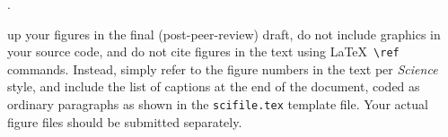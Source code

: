 \documentclass[12pt]{article}
\newcounter{lastnote}
\newenvironment{scilastnote}{%
\setcounter{lastnote}{\value{enumiv}}%
\addtocounter{lastnote}{+1}%
\begin{list}%
{\arabic{lastnote}.}
{\setlength{\leftmargin}{.22in}}
{\setlength{\labelsep}{.5em}}}
{\end{list}}
\begin{document}
\begin{scilastnote}
\end{scilastnote}






\clearpage

up your figures in the final (post-peer-review) draft, do not include graphics in your
source code, and do not cite figures in the text using \LaTeX\
\verb+\ref+ commands.  Instead, simply refer to the figure numbers in
the text per {\it Science\/} style, and include the list of captions at
the end of the document, coded as ordinary paragraphs as shown in the
\texttt{scifile.tex} template file.  Your actual figure files should
be submitted separately.
\end{document}
